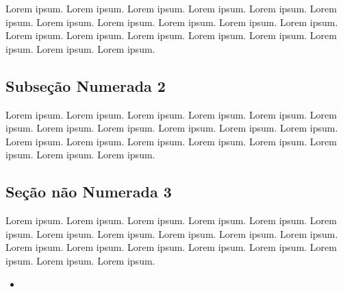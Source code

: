 \documentclass[
]{book}
\providecommand{\tightlist}{%
  \setlength{\itemsep}{0pt}\setlength{\parskip}{0pt}}
\begin{document}
Lorem ipsum. Lorem ipsum. Lorem ipsum. Lorem ipsum. Lorem ipsum. Lorem ipsum. Lorem ipsum. Lorem ipsum. Lorem ipsum. Lorem ipsum. Lorem ipsum. Lorem ipsum. Lorem ipsum. Lorem ipsum. Lorem ipsum. Lorem ipsum. Lorem ipsum. Lorem ipsum. Lorem ipsum.

\hypertarget{subseuxe7uxe3o-numerada-2-1}{%
\subsection{Subseção Numerada 2}\label{subseuxe7uxe3o-numerada-2-1}}

Lorem ipsum. Lorem ipsum. Lorem ipsum. Lorem ipsum. Lorem ipsum. Lorem ipsum. Lorem ipsum. Lorem ipsum. Lorem ipsum. Lorem ipsum. Lorem ipsum. Lorem ipsum. Lorem ipsum. Lorem ipsum. Lorem ipsum. Lorem ipsum. Lorem ipsum. Lorem ipsum. Lorem ipsum.

\hypertarget{seuxe7uxe3o-nuxe3o-numerada-3-5}{%
\subsection*{Seção não Numerada 3}\label{seuxe7uxe3o-nuxe3o-numerada-3-5}}

Lorem ipsum. Lorem ipsum. Lorem ipsum. Lorem ipsum. Lorem ipsum. Lorem ipsum. Lorem ipsum. Lorem ipsum. Lorem ipsum. Lorem ipsum. Lorem ipsum. Lorem ipsum. Lorem ipsum. Lorem ipsum. Lorem ipsum. Lorem ipsum. Lorem ipsum. Lorem ipsum. Lorem ipsum.

\begin{itemize}
\tightlist
\item
\end{itemize}

  
\end{document}
